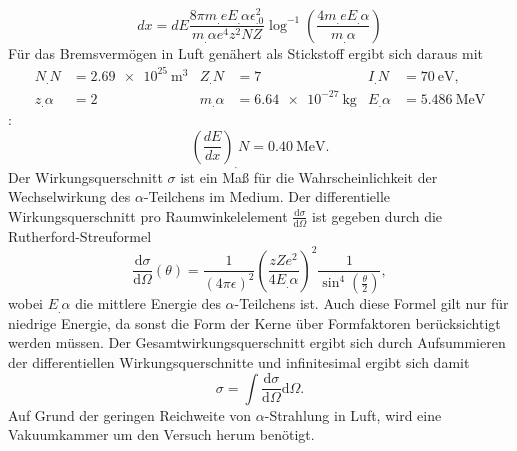 \begin{equation}
dx=dE\frac{8\pi m_.e E_.{\alpha}\epsilon^2_.0}{m_.{\alpha}e^4z^2NZ}\log^{-1}\left(\frac{4m_.e E_.{\alpha}}{m_.{\alpha}}\right)\label{eq:dx}
\end{equation}
Für das Bremsvermögen in Luft genähert als Stickstoff ergibt sich daraus mit
\begin{align*}
N_.N &= \SI{2,69e25}{\metre^3} & Z_.N&=7 & I_.N&=\SI{70}{\electronvolt},\\
z_.{\alpha}&=2 & m_.{\alpha}&=\SI{6,64e-27}{\kilo\gram} & E_.{\alpha}&=\SI{5,486}{\mega\electronvolt}
\end{align*}:
\begin{equation*}
\left(\frac{dE}{dx}\right)_.{N}=\SI{0,40}{\mega\electronvolt}\text{.}
\end{equation*}
Der Wirkungsquerschnitt $\sigma$ ist ein Maß für die Wahrscheinlichkeit der Wechselwirkung des $\alpha$-Teilchens im Medium.
Der differentielle Wirkungsquerschnitt pro Raumwinkelelement $\frac{\mathrm{d}\sigma}{\mathrm{d}\Omega}$ ist gegeben durch die Rutherford-Streuformel
\begin{equation}
\frac{\mathrm{d}\sigma}{\mathrm{d}\Omega}(\theta)=\frac{1}{(4\pi\epsilon)^2}\left(\frac{z Z e^2}{4 E_.{\alpha}}\right)^2\frac{1}{\sin^4{\left(\frac{\theta}{2}\right)}},\label{eq:RSF}
\end{equation}
wobei $E_.{\alpha}$ die mittlere Energie des $\alpha$-Teilchens ist. Auch diese Formel gilt nur für niedrige Energie, da sonst die Form der Kerne über Formfaktoren berücksichtigt werden müssen.
Der Gesamtwirkungsquerschnitt ergibt sich durch Aufsummieren der differentiellen Wirkungsquerschnitte und infinitesimal ergibt sich damit
\[
\sigma = \int \frac{\mathrm{d}\sigma}{\mathrm{d}\Omega}\mathrm{d}\Omega\text{.}
\]
Auf Grund der geringen Reichweite von $\alpha$-Strahlung in Luft, wird eine Vakuumkammer um den Versuch herum benötigt.






